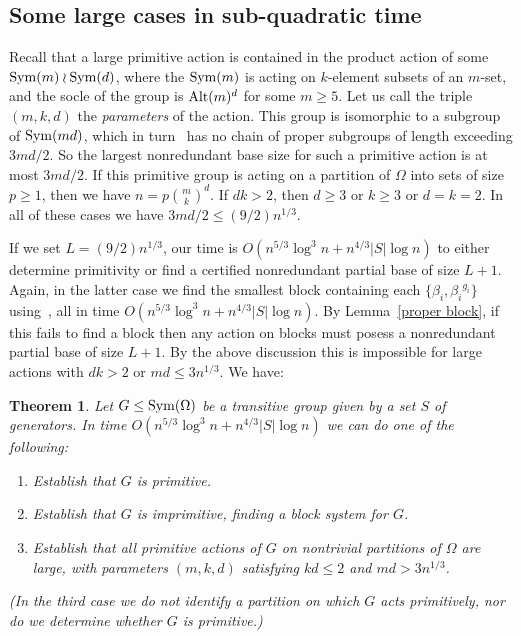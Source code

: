 \documentclass[12pt]{article}
\newcommand{\Sym}{{\rm Sym}}
\newcommand{\Alt}{{\rm Alt}}
\newtheorem{theorem}{Theorem}[section]
\begin{document}
\subsection{Some large cases in sub-quadratic time}\label{conclusion}

Recall that a large primitive action is contained in the product
action of some $\Sym(m)\wr\Sym(d)$, where the $\Sym(m)$ is acting
on $k$-element subsets of an $m$-set, and the socle of the group is $\Alt(m)^d$
for some $m\geq 5$.  Let us call the triple $(m,k,d)$ the {\em parameters}\/
of the action.
This group is isomorphic to a subgroup of $\Sym(md)$, which
in turn~\cite{BabaiLength,cameron1989chains}
has no chain of proper subgroups of length exceeding $3md/2$.
So the largest nonredundant base
size for such a primitive action is at most $3md/2$.
If this primitive group is acting on a partition of $\Omega$
into sets of size $p\geq 1$, then we have $n=p\binom{m}{k}^d$.
If $dk>2$, then $d\geq 3$ or  $k\geq 3$ or $d=k=2$.
In all of these cases we have $3md/2\leq (9/2)n^{1/3}$.


If we set $L=(9/2)n^{1/3}$, our time is
$O(n^{5/3}\log^3 n+n^{4/3}|S|\log n)$
to either determine primitivity or find a certified nonredundant partial
base of size $L+1$. Again, in the latter case we 
find the smallest block containing each $\{\beta_i,{\beta_i}^{g_i}\}$
using~\cite{atkinson1984group}, all in time $O(n^{5/3}\log^3 n+n^{4/3}|S|\log n)$.
By Lemma~\ref{proper block}, if this fails to find a block then
any action on blocks must posess a nonredundant partial base of size $L+1$.
By the above discussion this is impossible for large actions with $dk>2$ or $md\leq 3n^{1/3}$.
We have:

\begin{theorem}\label{five thirds}
  Let $G\leq\Sym(\Omega)$ be a
  transitive group given by
  a set $S$ of generators.  In time $O(n^{5/3}\log^3 n+n^{4/3}|S|\log n)$
  we can do one of the following:
  \begin{enumerate}
  \item Establish that $G$ is primitive.
  \item Establish that $G$ is imprimitive, finding a
    block system for $G$.
  \item Establish that all primitive actions of $G$
    on nontrivial partitions of $\Omega$ are large, with
    parameters $(m,k,d)$ satisfying $kd\leq 2$ and
    $md> 3n^{1/3}$.
  \end{enumerate}
  (In the third case we do not identify a partition on which
  $G$ acts primitively, nor do we determine whether $G$ is primitive.)
\end{theorem}
\end{document}
